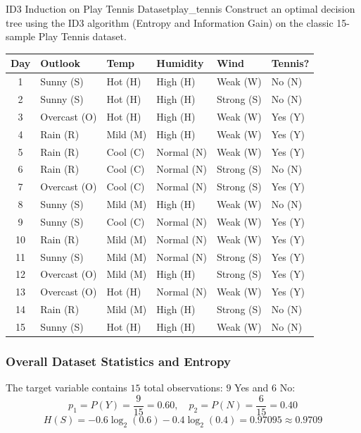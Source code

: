 \begin{example}{ID3 Induction on Play Tennis Dataset}{play_tennis}
Construct an optimal decision tree using the ID3 algorithm (Entropy and Information Gain) on the classic 15-sample Play Tennis dataset.

\begin{center}\renewcommand{\arraystretch}{1.35}
\begin{tabular}{clllll}
\toprule
\textbf{Day} & \textbf{Outlook} & \textbf{Temp} & \textbf{Humidity} & \textbf{Wind} & \textbf{Tennis?} \\
\midrule
1  & Sunny (S)    & Hot (H)  & High (H)   & Weak (W)   & No (N) \\
2  & Sunny (S)    & Hot (H)  & High (H)   & Strong (S) & No (N) \\
3  & Overcast (O) & Hot (H)  & High (H)   & Weak (W)   & Yes (Y) \\
4  & Rain (R)     & Mild (M) & High (H)   & Weak (W)   & Yes (Y) \\
5  & Rain (R)     & Cool (C) & Normal (N) & Weak (W)   & Yes (Y) \\
6  & Rain (R)     & Cool (C) & Normal (N) & Strong (S) & No (N) \\
7  & Overcast (O) & Cool (C) & Normal (N) & Strong (S) & Yes (Y) \\
8  & Sunny (S)    & Mild (M) & High (H)   & Weak (W)   & No (N) \\
9  & Sunny (S)    & Cool (C) & Normal (N) & Weak (W)   & Yes (Y) \\
10 & Rain (R)     & Mild (M) & Normal (N) & Weak (W)   & Yes (Y) \\
11 & Sunny (S)    & Mild (M) & Normal (N) & Strong (S) & Yes (Y) \\
12 & Overcast (O) & Mild (M) & High (H)   & Strong (S) & Yes (Y) \\
13 & Overcast (O) & Hot (H)  & Normal (N) & Weak (W)   & Yes (Y) \\
14 & Rain (R)     & Mild (M) & High (H)   & Strong (S) & No (N) \\
15 & Sunny (S)    & Hot (H)  & High (H)   & Weak (W)   & No (N) \\
\bottomrule
\end{tabular}
\end{center}

\subsubsection{Overall Dataset Statistics and Entropy}
The target variable contains $15$ total observations: $9$ Yes and $6$ No:
\begin{equation}
p_1 = P(Y) = \frac{9}{15} = 0.60, \quad p_2 = P(N) = \frac{6}{15} = 0.40
\end{equation}
\begin{equation}
H(S) = -0.6 \log_2(0.6) - 0.4 \log_2(0.4) = 0.97095 \approx 0.9709
\end{equation}


\end{example}
